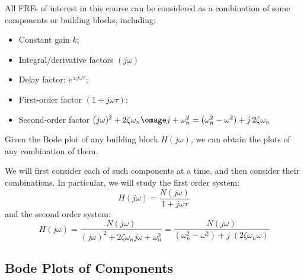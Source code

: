 All FRFs of interest in this course can be considered as a combination of 
some components or building blocks, including:
\begin{itemize}
  \item Constant gain $k$;
  \item Integral/derivative factors $(j\omega)$
  \item Delay factor: $e^{\pm j\omega \tau}$;
  \item First-order factor $(1+j\omega\tau)$;
  \item Second-order factor 
    $(j\omega)^2+2\zeta\omega_n\omage j+\omega_n^2
    =(\omega_n^2-\omega^2)+j\,2\zeta\omega_n$
\end{itemize}
Given the Bode plot of any building block $H(j\omega)$, we can obtain the plots
of any combination of them.

We will first consider each of such components at a time, and then consider 
their combinations. In particular, we will study the first order system:
\[ H(j\omega)=\frac{N(j\omega)}{1+j\omega \tau} \]
and the second order system:
\[ H(j\omega)=\frac{N(j\omega)}{(j\omega)^2+2\zeta\omega_n j\omega +\omega_n^2}
=\frac{N(j\omega)}{(\omega_n^2-\omega^2)+j\;(2\zeta\omega_n \omega) }\]

\subsection*{Bode Plots of Components}

